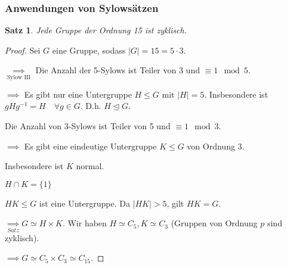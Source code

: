 \documentclass{article}
\theoremstyle{plain}
\newtheorem{theorem}{Satz}
\newcommand{\ug}{\leq}
\newcommand{\normal}{\trianglelefteq}
\newcommand{\iso}{\simeq}
\begin{document}
\subsubsection*{Anwendungen von Sylowsätzen}
\begin{theorem}
    Jede Gruppe der Ordnung 15 ist zyklisch.
\end{theorem}
\begin{proof}
    Sei $G$ eine Gruppe, sodass $|G|=15=5\cdot 3$.
    
    $\underset{\text{Sylow III}}{\implies}$ Die Anzahl der 5-Sylows ist Teiler von 3 und $\equiv 1\mod 5$.

    $\implies$ Es gibt nur eine Untergruppe $H\ug G$ mit $|H|=5$. Insbesondere ist $gHg^{-1}=H\quad\forall g\in G$. D.h. $H\normal G$.

    Die Anzahl von 3-Sylows ist Teiler von 5 und $\equiv 1\mod 3$.

    $\implies$ Es gibt eine eindeutige Untergruppe $K\ug G$ von Ordnung 3.

    Insbesondere ist $K$ normal.

    $H\cap K = \{1\}$

    $HK\ug G$ ist eine Untergruppe. Da $|HK|>5$, gilt $HK=G$.

    $\underset{Satz}{\implies} G\iso H\times K$. Wir haben $H \iso C_5, K\iso C_3$ (Gruppen von Ordnung $p$ sind zyklisch).

    $\implies G\iso C_5\times C_3\iso C_15$.
\end{proof}
\end{document}
